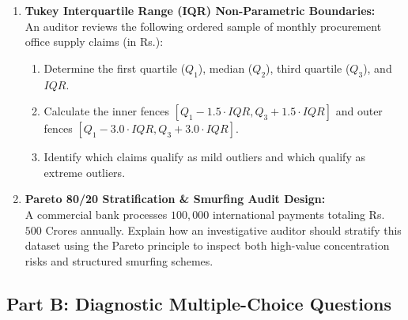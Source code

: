 \begin{enumerate}[label=\textbf{P6.\arabic*}]
    \item \textbf{Tukey Interquartile Range (IQR) Non-Parametric Boundaries:}\\
    An auditor reviews the following ordered sample of monthly procurement office supply claims (in Rs.):
    \begin{equation*}
    [1200, 1400, 1500, 1650, 1800, 1950, 2100, 2300, 2800, 3100, 4500, 9800]
    \end{equation*}
    \begin{enumerate}[label=(\alph*)]
        \item Determine the first quartile ($Q_1$), median ($Q_2$), third quartile ($Q_3$), and $IQR$.
        \item Calculate the inner fences $[Q_1 - 1.5 \cdot IQR, Q_3 + 1.5 \cdot IQR]$ and outer fences $[Q_1 - 3.0 \cdot IQR, Q_3 + 3.0 \cdot IQR]$.
        \item Identify which claims qualify as mild outliers and which qualify as extreme outliers.
    \end{enumerate}

    \item \textbf{Pareto 80/20 Stratification \& Smurfing Audit Design:}\\
    A commercial bank processes $100{,}000$ international payments totaling Rs.~$500$ Crores annually. Explain how an investigative auditor should stratify this dataset using the Pareto principle to inspect both high-value concentration risks and structured smurfing schemes.
\end{enumerate}

\subsection*{Part B: Diagnostic Multiple-Choice Questions}

